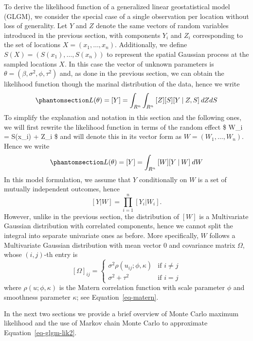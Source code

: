 \documentclass[
  letterpaper,
]{krantz}
\begin{document}
To derive the likelihood function of a generalized linear geostatistical
model (GLGM), we consider the special case of a single observation per
location without loss of generality. Let \(Y\) and \(Z\) denote the same
vectors of random variables introduced in the previous section, with
components \(Y_i\) and \(Z_i\) corresponding to the set of locations
\(X = (x_1, \ldots, x_n)\). Additionally, we define
\(S(X) = (S(x_1), \ldots, S(x_n))\) to represent the spatial Gaussian
process at the sampled locations \(X\). In this case the vector of
unknown parameters is \(\theta = (\beta, \sigma^2, \phi, \tau^2)\) and,
as done in the previous section, we can obtain the likelihood function
though the marinal distribution of the data, hence we write
\begin{equation}\phantomsection\label{eq-glgm-lik1}{
L(\theta) = [Y] = \int_{R^n} \int_{R^n} \: [Z] [S] [Y \:|\: Z, S] \: d Z d S
}\end{equation} To simplify the explanation and notation in this section
and the following ones, we will first rewrite the likelihood function in
terms of the random effect \$ W\_i = S(x\_i) + Z\_i \$ and will denote
this in its vector form as \(W = (W_1, \ldots, W_n)\). Hence we write
\begin{equation}\phantomsection\label{eq-glgm-lik2}{L(\theta) = [Y] = \int_{R^n} \: [W] [Y \:|\: W] \: d W}\end{equation}
In this model formulation, we assume that \(Y\) conditionally on \(W\)
is a set of mutually independent outcomes, hence \[
[Y | W]  = \prod_{i=1}^n [Y_i | W_i].
\] However, unlike in the previous section, the distribution of \([W]\)
is a Multivariate Gaussian distribution with correlated components,
hence we cannot split the integral into separate univariate ones as
before. More specifically, \(W\) follows a Multivariate Gaussian
distribution with mean vector \(0\) and covariance matrix \(\Omega\),
whose \((i, j)\)-th entry is \[
[\Omega]_{ij} = 
\begin{cases}
\sigma^2 \rho(u_{ij}; \phi, \kappa) & \mbox{if }i\neq j \\
\sigma^2 + \tau^2 &  \mbox{if }i = j
\end{cases}
\] where \(\rho(u;\phi,\kappa)\) is the Matern correlation function with
scale parameter \(\phi\) and smoothness parameter \(\kappa\); see
Equation~\ref{eq-matern}.

In the next two sections we provide a brief overview of Monte Carlo
maximum likelihood and the use of Markov chain Monte Carlo to
approximate Equation~\ref{eq-glgm-lik2}.
\end{document}
